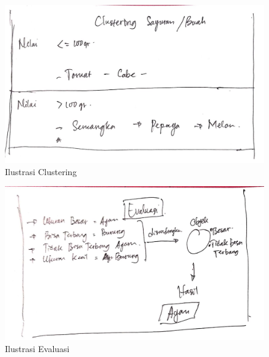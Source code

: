 \begin{figure}[ht]
      \centerline{\includegraphics[width=1\textwidth]
      {figures/c13}}
      \caption{Ilustrasi Clustering}
      \label{c13}
      \end{figure}

\begin{figure}[ht]
      \centerline{\includegraphics[width=1\textwidth]
      {figures/c14}}
      \caption{Ilustrasi Evaluasi}
      \label{c14}
      \end{figure}

